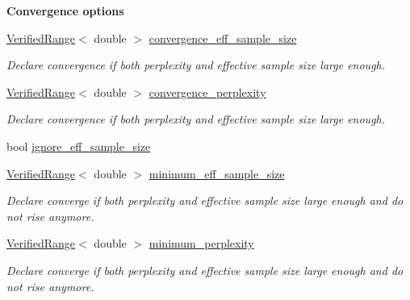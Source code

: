 \begin{Indent}{\bf Convergence options}\par
{\em \label{_amgrp2ecab0cd070c5334d222a1622ad7552f}
 }\begin{DoxyCompactItemize}
\item 
\hyperlink{classeos_1_1VerifiedRange}{VerifiedRange}$<$ double $>$ \hyperlink{structeos_1_1PopulationMonteCarloSampler_1_1Config_a69a93bb57d6610e06ea2f200e3d2ce42}{convergence\_\-eff\_\-sample\_\-size}
\begin{DoxyCompactList}\small\item\em Declare convergence if both perplexity and effective sample size large enough. \item\end{DoxyCompactList}\item 
\hyperlink{classeos_1_1VerifiedRange}{VerifiedRange}$<$ double $>$ \hyperlink{structeos_1_1PopulationMonteCarloSampler_1_1Config_a42a627c391f5278eff3a1c1de7f06985}{convergence\_\-perplexity}
\begin{DoxyCompactList}\small\item\em Declare convergence if both perplexity and effective sample size large enough. \item\end{DoxyCompactList}\item 
bool \hyperlink{structeos_1_1PopulationMonteCarloSampler_1_1Config_aec486491bd33a3edf40a6062b07e4066}{ignore\_\-eff\_\-sample\_\-size}
\item 
\hyperlink{classeos_1_1VerifiedRange}{VerifiedRange}$<$ double $>$ \hyperlink{structeos_1_1PopulationMonteCarloSampler_1_1Config_a765c46a4b99f711c59f02e1ea0d8fbe9}{minimum\_\-eff\_\-sample\_\-size}
\begin{DoxyCompactList}\small\item\em Declare converge if both perplexity and effective sample size large enough and do not rise anymore. \item\end{DoxyCompactList}\item 
\hyperlink{classeos_1_1VerifiedRange}{VerifiedRange}$<$ double $>$ \hyperlink{structeos_1_1PopulationMonteCarloSampler_1_1Config_a4cfd93c384604e24e58ace95bdc31a2d}{minimum\_\-perplexity}
\begin{DoxyCompactList}\small\item\em Declare converge if both perplexity and effective sample size large enough and do not rise anymore. \item\end{DoxyCompactList}\item 

\end{DoxyCompactItemize}
\end{Indent}
